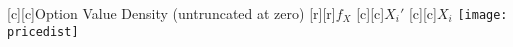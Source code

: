 \documentclass{standalone}
\begin{document}
[c][c]{Option Value Density (untruncated at zero)}
[r][r]{$f_X$}
[c][c]{$X_i'$}
[c][c]{$X_i$}
\texttt{[image: pricedist]}
\end{document}
